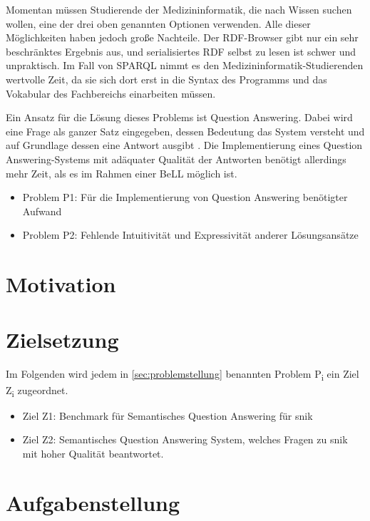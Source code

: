 Momentan müssen Studierende der Medizininformatik, die nach Wissen suchen wollen, eine der drei oben genannten Optionen verwenden.
Alle dieser Möglichkeiten haben jedoch große Nachteile.
Der RDF-Browser gibt nur ein sehr beschränktes Ergebnis aus, und serialisiertes RDF selbst zu lesen ist schwer und unpraktisch.
Im Fall von SPARQL nimmt es den Medizininformatik-Studierenden wertvolle Zeit, da sie sich dort erst in die Syntax des Programms und das Vokabular des Fachbereichs einarbeiten müssen.

Ein Ansatz für die Lösung dieses Problems ist Question Answering.
Dabei wird eine Frage als ganzer Satz eingegeben, dessen Bedeutung das System versteht und auf Grundlage dessen eine Antwort ausgibt \citep{qadefinition}.
Die Implementierung eines Question Answering-Systems mit adäquater Qualität der Antworten benötigt allerdings mehr Zeit, als es im Rahmen einer BeLL möglich ist.

\begin{itemize}
	\item Problem P1: Für die Implementierung von Question Answering benötigter Aufwand
	\item Problem P2: Fehlende Intuitivität und Expressivität anderer Lösungsansätze
\end{itemize}


\section{Motivation}


\section{Zielsetzung}\label{sec:zielsetzung}

Im Folgenden wird jedem in \cref{sec:problemstellung} benannten Problem P\textsubscript{i} ein Ziel Z\textsubscript{i} zugeordnet.

	\begin{itemize}
		\item Ziel Z1: Benchmark für Semantisches Question Answering für \ac{snik}
		\item Ziel Z2: Semantisches Question Answering System, welches Fragen zu \ac{snik} mit hoher Qualität beantwortet.
	\end{itemize}
\section{Aufgabenstellung}

